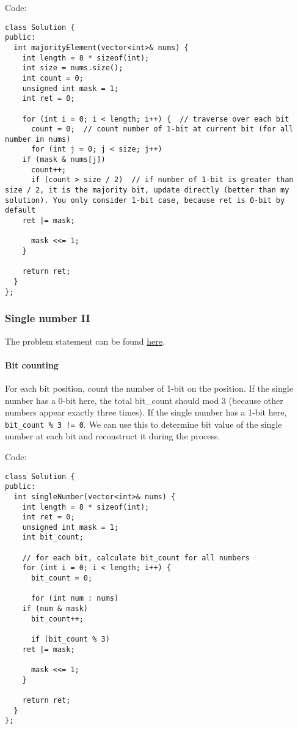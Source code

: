 \documentclass[12pt]{article}
\begin{document}
Code:
\begin{verbatim}
class Solution {
public:
  int majorityElement(vector<int>& nums) {
    int length = 8 * sizeof(int);
    int size = nums.size();
    int count = 0;
    unsigned int mask = 1;
    int ret = 0;

    for (int i = 0; i < length; i++) {  // traverse over each bit 
      count = 0;  // count number of 1-bit at current bit (for all number in nums)
      for (int j = 0; j < size; j++)
	if (mask & nums[j])
	  count++;
      if (count > size / 2)  // if number of 1-bit is greater than size / 2, it is the majority bit, update directly (better than my solution). You only consider 1-bit case, because ret is 0-bit by default
	ret |= mask;

      mask <<= 1;
    }

    return ret;
  }
};
\end{verbatim}
\subsubsection{Single number II}
\label{sec:org19ee27e}
The problem statement can be found \href{https://leetcode.com/problems/single-number-ii/}{here}.
\paragraph{Bit counting}
\label{sec:org3b30f2c}
For each bit position, count the number of 1-bit on the position. If the single number has a 0-bit here, the total bit\_count should mod 3 (because other numbers appear exactly three times). If the single number has a 1-bit here, \texttt{bit\_count \% 3 != 0}. We can use this to determine bit value of the single number at each bit and reconstruct it during the process.

Code:
\begin{verbatim}
class Solution {
public:
  int singleNumber(vector<int>& nums) {
    int length = 8 * sizeof(int);
    int ret = 0;
    unsigned int mask = 1;
    int bit_count;

    // for each bit, calculate bit_count for all numbers
    for (int i = 0; i < length; i++) {
      bit_count = 0;

      for (int num : nums)
	if (num & mask)
	  bit_count++;

      if (bit_count % 3)
	ret |= mask;

      mask <<= 1;
    }

    return ret;
  }
};
\end{verbatim}
\end{document}
